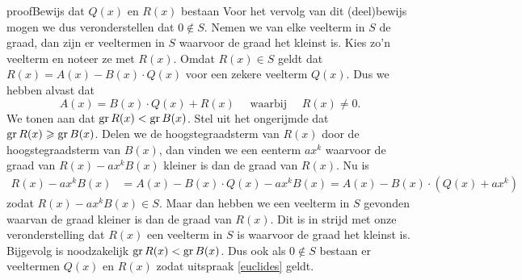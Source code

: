 \documentclass{ximera}
\begin{document}
\begin{Uitbreiding}
\begin{expandable}{proof}{Bewijs dat $Q(x)$ en $R(x)$ bestaan}
Voor het vervolg van dit (deel)bewijs mogen we dus veronderstellen dat $0 \not\in S$. Nemen we van elke veelterm in $S$ de graad, dan zijn er veeltermen in $S$ waarvoor de graad het kleinst is. Kies zo'n veelterm en noteer ze met $R(x)$. Omdat $R(x) \in S$ geldt dat $R(x) = A(x) - B(x)\cdot Q(x)$ voor een zekere veelterm $Q(x)$. Dus we hebben alvast dat
\[
A(x) = B(x)\cdot Q(x) + R(x) \quad \text{ waarbij } \quad R(x) \neq 0.
\]
We tonen aan dat $\operatorname{gr} R(x) < \operatorname{gr} B(x)$. Stel uit het ongerijmde dat $\operatorname{gr} R(x) \geqslant \operatorname{gr} B(x)$. Delen we de hoogstegraadsterm van $R(x)$ door de hoogstegraadsterm van $B(x)$, dan vinden we een eenterm $ax^k$ waarvoor de graad van $R(x) - ax^k B(x)$ kleiner is dan de graad van $R(x)$. Nu is
\begin{align*}
R(x) - ax^k B(x) & = A(x) - B(x)\cdot Q(x) - ax^k B(x) = A(x) - B(x)\cdot (Q(x) + ax^k) 
\end{align*}
zodat $R(x) - ax^k B(x) \in S$. Maar dan hebben we een veelterm in $S$ gevonden waarvan de graad kleiner is dan de graad van $R(x)$. Dit is in strijd  met onze veronderstelling dat $R(x)$ een veelterm in $S$ is waarvoor de graad het kleinst is. Bijgevolg is noodzakelijk $\operatorname{gr} R(x) < \operatorname{gr} B(x)$. Dus ook als $0 \not\in S$ bestaan er veeltermen $Q(x)$ en $R(x)$ zodat uitspraak \eqref{euclides} geldt.

\end{expandable}

\end{Uitbreiding}
\end{document}
